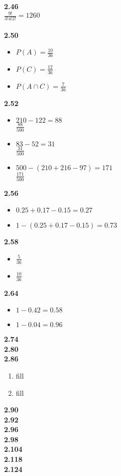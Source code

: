 \documentclass{article}
\begin{document}
    \textbf{2.46}\\
        $\frac{9!}{3!4!2!} = 1260$\\\\
    \textbf{2.50}
        \begin{itemize}
            \item $P(A) = \frac{10}{36}$
            \item $P(C) = \frac{12}{36}$
            \item $P(A\cap C) = \frac{7}{36}$
        \end{itemize}
    \textbf{2.52}
        \begin{itemize}
            \item $210 - 122 = 88$\\
                $\frac{88}{500}$
            \item $83 - 52 = 31$\\
                $\frac{31}{500}$
            \item $500 - (210 + 216 - 97) = 171$\\
                $\frac{171}{500}$
        \end{itemize}
    \textbf{2.56}
        \begin{itemize}
            \item $0.25 + 0.17 - 0.15 = 0.27$
            \item $1 - (0.25 + 0.17 - 0.15) = 0.73$
        \end{itemize}
    \textbf{2.58}
        \begin{itemize}
            \item $\frac{5}{36}$
            \item $\frac{10}{36}$
        \end{itemize}
    \textbf{2.64}
        \begin{itemize}
            \item $1 - 0.42 = 0.58$
            \item $1 - 0.04 = 0.96$
        \end{itemize}
    \textbf{2.74}\\
    \textbf{2.80}\\
    \textbf{2.86}
    \begin{enumerate}
        \item fill
        \item fill
    \end{enumerate}
    \textbf{2.90}\\
    \textbf{2.92}\\
    \textbf{2.96}\\
    \textbf{2.98}\\
    \textbf{2.104}\\
    \textbf{2.118}\\
    \textbf{2.124}\\
    
\end{document}
